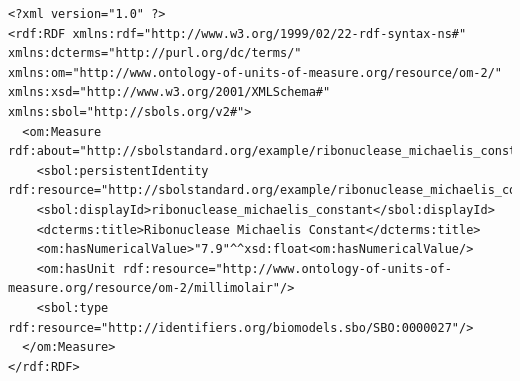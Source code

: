 \begin{lstlisting}
<?xml version="1.0" ?>
<rdf:RDF xmlns:rdf="http://www.w3.org/1999/02/22-rdf-syntax-ns#" xmlns:dcterms="http://purl.org/dc/terms/" xmlns:om="http://www.ontology-of-units-of-measure.org/resource/om-2/" xmlns:xsd="http://www.w3.org/2001/XMLSchema#" xmlns:sbol="http://sbols.org/v2#">
  <om:Measure rdf:about="http://sbolstandard.org/example/ribonuclease_michaelis_constant/1">
    <sbol:persistentIdentity rdf:resource="http://sbolstandard.org/example/ribonuclease_michaelis_constant"/>
    <sbol:displayId>ribonuclease_michaelis_constant</sbol:displayId>
    <dcterms:title>Ribonuclease Michaelis Constant</dcterms:title>
    <om:hasNumericalValue>"7.9"^^xsd:float<om:hasNumericalValue/>
    <om:hasUnit rdf:resource="http://www.ontology-of-units-of-measure.org/resource/om-2/millimolair"/>
    <sbol:type rdf:resource="http://identifiers.org/biomodels.sbo/SBO:0000027"/>
  </om:Measure>
</rdf:RDF>
\end{lstlisting}
\label{ser:Measure}


